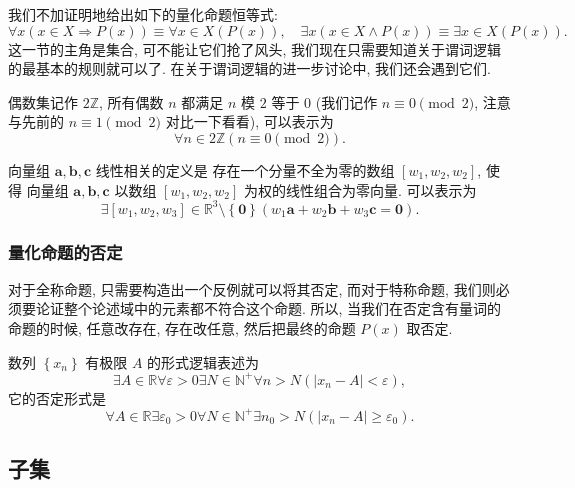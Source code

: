\documentclass[10pt,UTF8]{book} %
\begin{document}
我们不加证明地给出如下的量化命题恒等式:
\[ \forall x \left( x \in X \Longrightarrow P(x) \right)
\equiv \forall x \in X \left( P(x) \right),
\quad 
\exists x \left( x \in X \wedge P(x) \right)
\equiv \exists x \in X \left( P(x) \right). \]
这一节的主角是集合, 可不能让它们抢了风头, 我们现在只需要知道关于谓词逻辑的最基本的规则就可以了.
在关于谓词逻辑的进一步讨论中, 我们还会遇到它们.

\begin{example}
    偶数集记作 $2\mathbb{Z}$, {\kaishu 所有偶数 $n$ 都满足 $n$ 模 $2$ 等于 $0$}
    (我们记作 $n \equiv 0 \pmod 2$, 注意与先前的 $n \equiv 1 \pmod 2$ 对比一下看看), 
    可以表示为
    \[ \forall n \in 2\mathbb{Z} \left(
        n \equiv 0 \pmod 2
    \right). \]
\end{example}
\begin{example}
    向量组 $\boldsymbol{a}, \boldsymbol{b}, \boldsymbol{c}$ 线性相关的定义是
    存在一个分量不全为零的数组 $[w_1,w_2,w_2]$, 使得
    向量组 $\boldsymbol{a}, \boldsymbol{b}, \boldsymbol{c}$ 以数组 $[w_1,w_2,w_2]$
    为权的线性组合为零向量. 可以表示为
    \[ \exists [w_1,w_2,w_3] \in \mathbb{R}^3\setminus\left\{\boldsymbol{0}\right\}
    \left(
        w_1\boldsymbol{a} + w_2\boldsymbol{b} + w_3\boldsymbol{c} = \boldsymbol{0}
    \right). \]
\end{example}

\subsubsection{量化命题的否定}

对于全称命题, 只需要构造出一个反例就可以将其否定,
而对于特称命题, 我们则必须要论证整个论述域中的元素都不符合这个命题. 所以,
当我们在否定含有量词的命题的时候, {\kaishu 任意改存在, 存在改任意, 然后把最终的命题 $P(x)$ 取否定}.
\begin{example}
    数列 $\left\{ x_n \right\}$ 有极限 $A$ 的形式逻辑表述为
    \[ \exists A \in \mathbb{R} \forall \varepsilon > 0 \exists N \in \mathbb{N}^+ \forall n>N \left(
        |x_n - A| < \varepsilon
    \right), \]
    它的否定形式是
    \[ \forall A \in \mathbb{R} \exists \varepsilon_0 > 0 \forall N \in \mathbb{N}^+ \exists n_0 > N \left(
        |x_n - A| \geqslant \varepsilon_0
    \right). \]
\end{example}

\subsection{子集}
\end{document}
